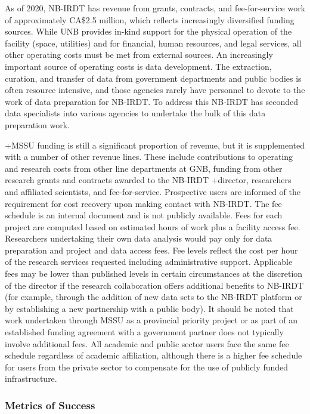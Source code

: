 \documentclass[
]{WileySix}
\begin{document}
As of 2020, NB-IRDT has revenue from grants, contracts, and fee-for-service work of approximately CA\$2.5 million, which reflects increasingly diversified funding sources. While UNB provides in-kind support for the physical operation of the facility (space, utilities) and for financial, human resources, and legal services, all other operating costs must be met from external sources. An increasingly important source of operating costs is data development. The extraction, curation, and transfer of data from government departments and public bodies is often resource intensive, and those agencies rarely have personnel to devote to the work of data preparation for NB-IRDT. To address this NB-IRDT has seconded data specialists into various agencies to undertake the bulk of this data preparation work.

+MSSU\textbar{} funding is still a significant proportion of revenue, but it is supplemented with a number of other revenue lines. These include contributions to operating and research costs from other line departments at GNB, funding from other research grants and contracts awarded to the NB-IRDT +director\textbar, researchers and affiliated scientists, and fee-for-service. Prospective users are informed of the requirement for cost recovery upon making contact with NB-IRDT. The fee schedule is an internal document and is not publicly available. Fees for each project are computed based on estimated hours of work plus a facility access fee. Researchers undertaking their own data analysis would pay only for data preparation and project and data access fees. Fee levels reflect the cost per hour of the research services requested including administrative support. Applicable fees may be lower than published levels in certain circumstances at the discretion of the director if the research collaboration offers additional benefits to NB-IRDT (for example, through the addition of new data sets to the NB-IRDT platform or by establishing a new partnership with a public body). It should be noted that work undertaken through MSSU as a provincial priority project or as part of an established funding agreement with a government partner does not typically involve additional fees. All academic and public sector users face the same fee schedule regardless of academic affiliation, although there is a higher fee schedule for users from the private sector to compensate for the use of publicly funded infrastructure.

\hypertarget{metrics-of-success-2}{%
\subsubsection{Metrics of Success}\label{metrics-of-success-2}}
\end{document}
